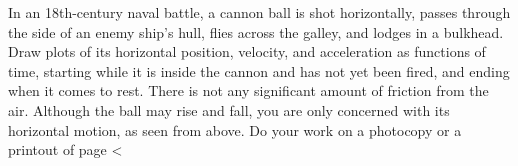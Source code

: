 In an 18th-century naval battle, a cannon ball is shot
horizontally, passes through the side of an enemy ship's
hull, flies across the galley, and lodges in a bulkhead.
Draw plots of its horizontal position, velocity, and
acceleration as functions of time, starting while it is
inside the cannon and has not yet been fired, and ending
when it comes to rest. There is not any significant amount
of friction from the air. Although the ball may rise and
fall, you are only concerned with its horizontal motion, as seen from above.
Do your work on a photocopy or a printout of 
page <%
